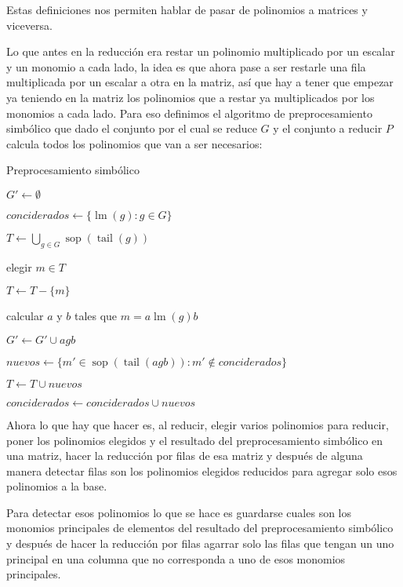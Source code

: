 \documentclass[12pt]{report}
\theoremstyle{customstyle}
\theoremstyle{factstyle}
\DeclareMathOperator{\sop}{sop}
\DeclareMathOperator{\lm}{lm}
\DeclareMathOperator{\tail}{tail}
\begin{document}
Estas definiciones nos permiten hablar de pasar de polinomios a matrices y viceversa.

Lo que antes en la reducción era restar un polinomio multiplicado por un escalar y un monomio a cada lado, la idea es que ahora pase a ser restarle una fila multiplicada por un escalar a otra en la matriz, así que hay a tener que empezar ya teniendo en la matriz los polinomios que a restar ya multiplicados por los monomios a cada lado. Para eso definimos el algoritmo de preprocesamiento simbólico que dado el conjunto por el cual se reduce $G$ y el conjunto a reducir $P$ calcula todos los polinomios que van a ser necesarios:

\begin{algorithm}[H] %
  \caption{Preprocesamiento simbólico}\label{alg:Preprocesamiento simbólico}
  $G' ← ∅$

  $conciderados ← \{\lm(g) : g ∈ G\}$

  $T ← ⋃_{g ∈ G} \sop(\tail(g))$

   {
    elegir $m ∈ T$

    $T ← T - \{m\}$

     {
      \If{$\lm(g) | m$} {
        calcular $a$ y $b$ tales que $m = a \lm(g) b$

        $G' ← G' ∪ {agb}$

        $nuevos ← \{m' ∈ \sop(\tail(agb)) : m' ∉ conciderados\}$

        $T ← T ∪ nuevos$

        $conciderados ← conciderados ∪ nuevos$
      }
    }
  }

\end{algorithm}

Ahora lo que hay que hacer es, al reducir, elegir varios polinomios para reducir, poner los polinomios elegidos y el resultado del preprocesamiento simbólico en una matriz, hacer la reducción por filas de esa matriz y después de alguna manera detectar filas son los polinomios elegidos reducidos para agregar solo esos polinomios a la base.

Para detectar esos polinomios lo que se hace es guardarse cuales son los monomios principales de elementos del resultado del preprocesamiento simbólico y después de hacer la reducción por filas agarrar solo las filas que tengan un uno principal en una columna que no corresponda a uno de esos monomios principales.
\end{document}
